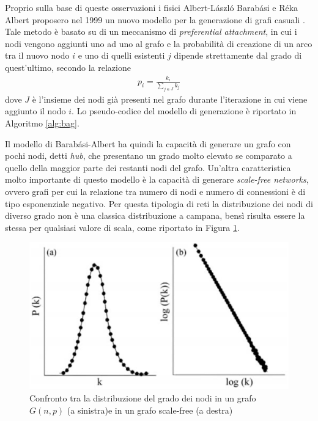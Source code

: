 Proprio sulla base di queste osservazioni i fisici Albert-László Barabási e Réka Albert proposero nel 1999 un nuovo modello per la generazione di grafi casuali \cite{Barab_si_1999}. Tale metodo è basato su di un meccanismo di \textit{preferential attachment}, in cui i nodi vengono aggiunti uno ad uno al grafo e la probabilità di creazione di un arco tra il nuovo nodo $i$ e uno di quelli esistenti $j$ dipende strettamente dal grado di quest'ultimo, secondo la relazione
\begin{align*}
p_i = \frac{k_i}{\sum_{j \in J}k_j}
\end{align*}
dove $J$ è l'insieme dei nodi già presenti nel grafo durante l'iterazione in cui viene aggiunto il nodo $i$. Lo pseudo-codice del modello di generazione è riportato in Algoritmo \ref{alg:bag}.

Il modello di Barabási-Albert ha quindi la capacità di generare un grafo con pochi nodi, detti \textit{hub}, che presentano un grado molto elevato se comparato a quello della maggior parte dei restanti nodi del grafo. Un'altra caratteristica molto importante di questo modello è la capacità di generare \textit{scale-free networks}, ovvero grafi per cui la relazione tra numero di nodi e numero di connessioni è di tipo esponenziale negativo. Per questa tipologia di reti la distribuzione dei nodi di diverso grado non è una classica distribuzione a campana, bensì risulta essere la stessa per qualsiasi valore di scala, come riportato in Figura \ref{fig:bagdist}.

\begin{figure}[h!]
     \centering
       \includegraphics[scale=0.4]{images/bagdist.eps}
       \caption{Confronto tra la distribuzione del grado dei nodi in un grafo $G(n,p)$ (a sinistra)e in un grafo scale-free (a destra) \cite{costa}}
        \label{fig:bagdist}
\end{figure}

